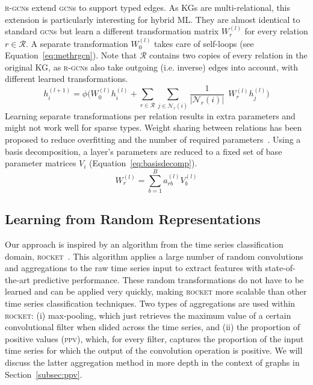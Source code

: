 \documentclass{llncs}
\begin{document}
\textsc{r-gcn}s extend \textsc{gcn}s to support typed edges. As KGs are multi-relational, this extension is particularly interesting for hybrid ML. They are almost identical to standard \textsc{gcn}s but learn a different transformation matrix $W_r^{(l)}$ for every relation $r \in \mathcal{R}$. A separate transformation $W_0^{(l)}$ takes care of self-loops (see Equation~\ref{eq:methrgcn}). Note that $\mathcal{R}$ contains two copies of every relation in the original KG, as \textsc{r-gcn}s also take outgoing (i.e. inverse) edges into account, with different learned transformations.
\begin{equation}
    \label{eq:methrgcn}
    h_i^{(l+1)} = \phi \Bigg(W_0^{(l)} h_i^{(l)} + \sum\limits_{r \in \mathcal{R}}\sum_{j \in \mathcal{N}_r(i)} \frac{1}{|\mathcal{N}_r(i)|} \;\, W_r^{(l)} h_j^{(l)} \Bigg)
\end{equation}
Learning separate transformations per relation results in extra parameters and might not work well for sparse types. Weight sharing between relations has been proposed to reduce overfitting and the number of required parameters~\cite{schlichtkrull2018modeling}. Using a basis decomposition, a layer's parameters are reduced to a fixed set of base parameter matrices $V_i$ (Equation~\ref{eq:basisdecomp}).
\begin{equation}
    \label{eq:basisdecomp}
    W^{(l)}_{r} = \sum_{b=1}^{B}a^{(l)}_{rb}V^{(l)}_{b}
\end{equation}


\subsection{Learning from Random Representations}
Our approach is inspired by an algorithm from the time series classification domain, \textsc{rocket}~\cite{dempster2020rocket,dempster2021minirocket}. This algorithm applies a large number of random convolutions and aggregations to the raw time series input to extract features with state-of-the-art predictive performance. These random transformations do not have to be learned and can be applied very quickly, making \textsc{rocket} more scalable than other time series classification techniques. Two types of aggregations are used within \textsc{rocket}: (i) max-pooling, which just retrieves the maximum value of a certain convolutional filter when slided across the time series, and (ii) the proportion of positive values (\textsc{ppv}), which, for every filter, captures the proportion of the input time series for which the output of the convolution operation is positive. We will discuss the latter aggregation method in more depth in the context of graphs in Section~\ref{subsec:ppv}.
\end{document}

